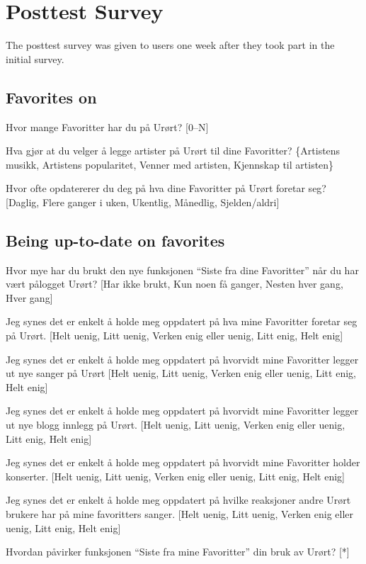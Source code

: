 \section{Posttest Survey}

The posttest survey was given to users one week after they took part in the
initial survey.

\subsection{Favorites on \urort{}}

\begin{enum}
  \item Hvor mange Favoritter har du på Urørt?
    [0--N]
  \item Hva gjør at du velger å legge artister på Urørt til dine Favoritter?
    \{Artistens musikk, Artistens popularitet, Venner med artisten,
    Kjennskap til artisten\}
  \item  Hvor ofte opdatererer du deg på hva dine Favoritter på Urørt
    foretar seg?
    [Daglig, Flere ganger i uken, Ukentlig, Månedlig, Sjelden/aldri]
\end{enum}

\subsection{Being up-to-date on favorites}

\begin{enum}
  \item Hvor mye har du brukt den nye funksjonen ``Siste fra dine Favoritter''
    når du har vært pålogget Urørt?
    [Har ikke brukt, Kun noen få ganger, Nesten hver gang, Hver gang]
  \item Jeg synes det er enkelt å holde meg oppdatert på
    hva mine Favoritter foretar seg på Urørt.
    [Helt uenig, Litt uenig, Verken enig eller uenig, Litt enig, Helt enig]
  \item Jeg synes det er enkelt å holde meg oppdatert på
    hvorvidt mine Favoritter legger ut nye sanger på Urørt
    [Helt uenig, Litt uenig, Verken enig eller uenig, Litt enig, Helt enig]
  \item Jeg synes det er enkelt å holde meg oppdatert på
    hvorvidt mine Favoritter legger ut nye blogg innlegg på Urørt.
    [Helt uenig, Litt uenig, Verken enig eller uenig, Litt enig, Helt enig]
  \item Jeg synes det er enkelt å holde meg oppdatert på
    hvorvidt mine Favoritter holder konserter.
    [Helt uenig, Litt uenig, Verken enig eller uenig, Litt enig, Helt enig]
  \item Jeg synes det er enkelt å holde meg oppdatert på
    hvilke reaksjoner andre Urørt brukere har på mine favoritters sanger.
    [Helt uenig, Litt uenig, Verken enig eller uenig, Litt enig, Helt enig]
  \item Hvordan påvirker funksjonen ``Siste fra mine Favoritter'' din bruk av
    Urørt? [*]
\end{enum}


